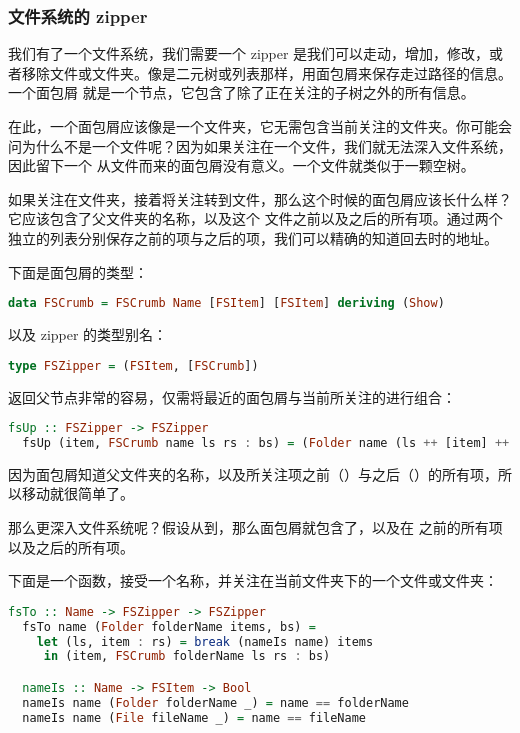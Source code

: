 \documentclass[./main.tex]{subfiles}
\begin{document}
\subsubsection*{文件系统的 zipper}

我们有了一个文件系统，我们需要一个 zipper 是我们可以走动，增加，修改，或者移除文件或文件夹。像是二元树或列表那样，用面包屑来保存走过路径的信息。一个面包屑
就是一个节点，它包含了除了正在关注的子树之外的所有信息。

在此，一个面包屑应该像是一个文件夹，它无需包含当前关注的文件夹。你可能会问为什么不是一个文件呢？因为如果关注在一个文件，我们就无法深入文件系统，因此留下一个
从文件而来的面包屑没有意义。一个文件就类似于一颗空树。

如果关注在文件夹，接着将关注转到文件，那么这个时候的面包屑应该长什么样？它应该包含了父文件夹的名称，以及这个
文件之前以及之后的所有项。通过两个独立的列表分别保存之前的项与之后的项，我们可以精确的知道回去时的地址。

下面是面包屑的类型：

\begin{lstlisting}[language=Haskell]
  data FSCrumb = FSCrumb Name [FSItem] [FSItem] deriving (Show)
\end{lstlisting}

以及 zipper 的类型别名：

\begin{lstlisting}[language=Haskell]
  type FSZipper = (FSItem, [FSCrumb])
\end{lstlisting}

返回父节点非常的容易，仅需将最近的面包屑与当前所关注的进行组合：

\begin{lstlisting}[language=Haskell]
  fsUp :: FSZipper -> FSZipper
  fsUp (item, FSCrumb name ls rs : bs) = (Folder name (ls ++ [item] ++ rs), bs)
\end{lstlisting}

因为面包屑知道父文件夹的名称，以及所关注项之前（）与之后（）的所有项，所以移动就很简单了。

那么更深入文件系统呢？假设从到，那么面包屑就包含了，以及在
之前的所有项以及之后的所有项。

下面是一个函数，接受一个名称，并关注在当前文件夹下的一个文件或文件夹：

\begin{lstlisting}[language=Haskell]
  fsTo :: Name -> FSZipper -> FSZipper
  fsTo name (Folder folderName items, bs) =
    let (ls, item : rs) = break (nameIs name) items
     in (item, FSCrumb folderName ls rs : bs)

  nameIs :: Name -> FSItem -> Bool
  nameIs name (Folder folderName _) = name == folderName
  nameIs name (File fileName _) = name == fileName
\end{lstlisting}
\end{document}
